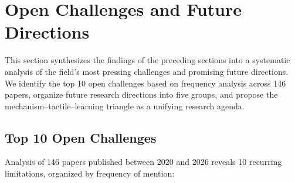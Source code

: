 \section{Open Challenges and Future Directions}
\label{sec:discussion}

This section synthesizes the findings of the preceding sections into a systematic analysis of the field's most pressing challenges and promising future directions. We identify the top 10 open challenges based on frequency analysis across 146 papers, organize future research directions into five groups, and propose the mechanism--tactile--learning triangle as a unifying research agenda.

\subsection{Top 10 Open Challenges}

Analysis of 146 papers published between 2020 and 2026 reveals 10 recurring limitations, organized by frequency of mention:

